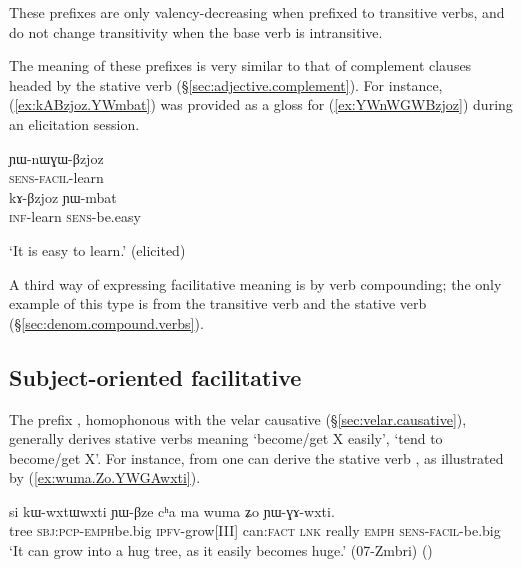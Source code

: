 These prefixes are only valency-decreasing when prefixed to transitive verbs, and do not change transitivity when the base verb is intransitive.

The meaning of these prefixes is very similar to that of complement clauses headed by the stative verb  (§\ref{sec:adjective.complement}). For instance, (\ref{ex:kABzjoz.YWmbat}) was provided as a gloss for (\ref{ex:YWnWGWBzjoz}) during an elicitation session.

\begin{exe}
\ex 
\begin{xlist}
\ex \label{ex:YWnWGWBzjoz}
\gll ɲɯ-nɯɣɯ-βzjoz \\
\textsc{sens}-\textsc{facil}-learn \\
\ex \label{ex:kABzjoz.YWmbat}
\gll kɤ-βzjoz ɲɯ-mbat \\
\textsc{inf}-learn \textsc{sens}-be.easy \\
\end{xlist}
\glt `It is easy to learn.' (elicited)
\end{exe}

A third way of expressing facilitative meaning is by verb compounding; the only example of this type is  from the transitive verb  and the stative verb    (§\ref{sec:denom.compound.verbs}).
 
\subsection{Subject-oriented facilitative} \label{sec:facilitative.GA}
The prefix , homophonous with the velar causative  (§\ref{sec:velar.causative}), generally derives stative verbs meaning `become/get X easily', `tend to become/get X'. For instance, from  one can derive the stative verb , as illustrated by (\ref{ex:wuma.Zo.YWGAwxti}). 

\begin{exe}
\ex \label{ex:wuma.Zo.YWGAwxti}
\gll si kɯ-wxtɯ\redp{}wxti ɲɯ-βze cʰa ma wuma ʑo ɲɯ-ɣɤ-wxti.  \\
tree \textsc{sbj}:\textsc{pcp}-\textsc{emph}\redp{}be.big \textsc{ipfv}-grow[III] can:\textsc{fact} \textsc{lnk} really \textsc{emph} \textsc{sens}-\textsc{facil}-be.big \\
\glt `It can grow into a hug tree, as it easily becomes huge.' (07-Zmbri) 	()
\end{exe}
 
